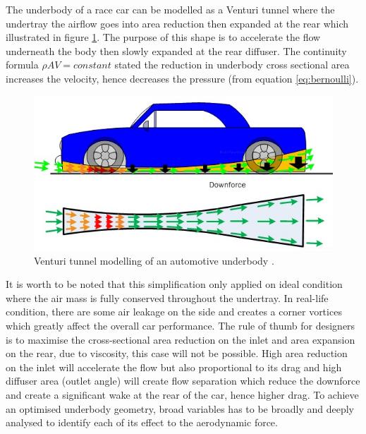 \noindent The underbody of a race car can be modelled as a Venturi tunnel where the undertray the airflow goes into area reduction then expanded at the rear which illustrated in figure \ref{fig:venturi_tunnel_car}. The purpose of this shape is to accelerate the flow underneath the body then slowly expanded at the rear diffuser. The continuity formula $\rho AV = constant$ stated the reduction in underbody cross sectional area increases the velocity, hence decreases the pressure (from equation \ref{eq:bernoulli}).

\begin{figure}[!ht]
    \centering
    \includegraphics[scale=0.8]{Figures/venturi_tunnel.jpg}
    \caption{Venturi tunnel modelling of an automotive underbody \cite{Anonymous2020RaceDesign}.}
    \label{fig:venturi_tunnel_car}
\end{figure}
\noindent It is worth to be noted that this simplification only applied on ideal condition where the air mass is fully conserved throughout the undertray. In real-life condition, there are some air leakage on the side and creates a corner vortices which greatly affect the overall car performance. The rule of thumb for designers is to maximise the cross-sectional area reduction on the inlet and area expansion on the rear, due to viscosity, this case will not be possible. High area reduction on the inlet will accelerate the flow but also proportional to its drag and high diffuser area (outlet angle) will create flow separation which reduce the downforce and create a significant wake at the rear of the car, hence higher drag. To achieve an optimised underbody geometry, broad variables has to be broadly and deeply analysed to identify each of its effect to the aerodynamic force.


